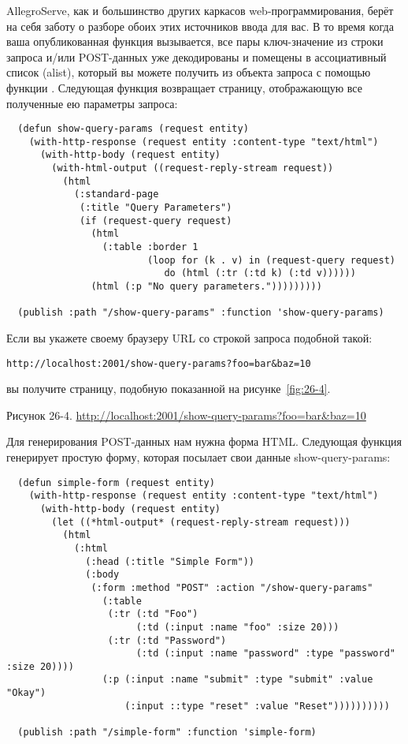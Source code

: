 AllegroServe, как и большинство других каркасов web-программирования, берёт на себя заботу
о разборе обоих этих источников ввода для вас. В то время когда ваша опубликованная
функция вызывается, все пары ключ-значение из строки запроса и/или POST-данных уже
декодированы и помещены в ассоциативный список (alist), который вы можете получить из
объекта запроса с помощью функции . Следующая функция возвращает
страницу, отображающую все полученные ею параметры запроса:

\begin{lstlisting}
  (defun show-query-params (request entity)
    (with-http-response (request entity :content-type "text/html")
      (with-http-body (request entity)
        (with-html-output ((request-reply-stream request))
          (html
            (:standard-page
             (:title "Query Parameters")
             (if (request-query request)
               (html 
                 (:table :border 1
                         (loop for (k . v) in (request-query request)
                            do (html (:tr (:td k) (:td v))))))
               (html (:p "No query parameters.")))))))))

  (publish :path "/show-query-params" :function 'show-query-params)
\end{lstlisting}

Если вы укажете своему браузеру URL со строкой запроса подобной такой:

\begin{lstlisting}[style=lisprepl]
  http://localhost:2001/show-query-params?foo=bar&baz=10
\end{lstlisting}

вы получите страницу, подобную показанной на рисунке~\ref{fig:26-4}.

Рисунок 26-4. \url{http://localhost:2001/show-query-params?foo=bar&baz=10}

Для генерирования POST-данных нам нужна форма HTML. Следующая функция генерирует простую
форму, которая посылает свои данные show-query-params:

\begin{lstlisting}
  (defun simple-form (request entity)
    (with-http-response (request entity :content-type "text/html")
      (with-http-body (request entity)
        (let ((*html-output* (request-reply-stream request)))
          (html
            (:html
              (:head (:title "Simple Form"))
              (:body
               (:form :method "POST" :action "/show-query-params"
                 (:table
                  (:tr (:td "Foo")
                       (:td (:input :name "foo" :size 20)))
                  (:tr (:td "Password")
                       (:td (:input :name "password" :type "password" :size 20))))
                 (:p (:input :name "submit" :type "submit" :value "Okay")
                     (:input ::type "reset" :value "Reset"))))))))))

  (publish :path "/simple-form" :function 'simple-form)
\end{lstlisting}

